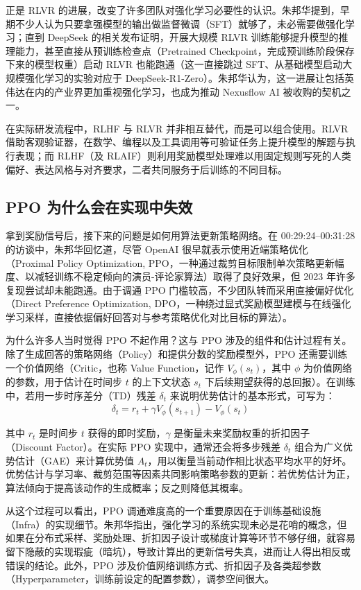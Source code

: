 \documentclass[UTF8,a4paper,11pt,fontset=fandol]{ctexart}
\begin{document}
正是 RLVR 的进展，改变了许多团队对强化学习必要性的认识。朱邦华提到，早期不少人认为只要拿强模型的输出做监督微调（SFT）就够了，未必需要做强化学习；直到 DeepSeek 的相关发布证明，开展大规模 RLVR 训练能够提升模型的推理能力，甚至直接从预训练检查点（Pretrained Checkpoint，完成预训练阶段保存下来的模型权重）启动 RLVR 也能跑通（这一直接跳过 SFT、从基础模型启动大规模强化学习的实验对应于 DeepSeek-R1-Zero）。朱邦华认为，这一进展让包括英伟达在内的产业界更加重视强化学习，也成为推动 Nexusflow AI 被收购的契机之一。

在实际研发流程中，RLHF 与 RLVR 并非相互替代，而是可以组合使用。RLVR 借助客观验证器，在数学、编程以及工具调用等可验证任务上提升模型的解题与执行表现；而 RLHF（及 RLAIF）则利用奖励模型处理难以用固定规则写死的人类偏好、表达风格与对齐要求，二者共同服务于后训练的不同目标。

\subsection{PPO 为什么会在实现中失效}
拿到奖励信号后，接下来的问题是如何用算法更新策略网络。在 00:29:24–00:31:28 的访谈中，朱邦华回忆道，尽管 OpenAI 很早就表示使用近端策略优化（Proximal Policy Optimization, PPO，一种通过裁剪目标限制单次策略更新幅度、以减轻训练不稳定倾向的演员-评论家算法）取得了良好效果，但 2023 年许多复现尝试却未能跑通。由于调通 PPO 门槛较高，不少团队转而采用直接偏好优化（Direct Preference Optimization, DPO，一种绕过显式奖励模型建模与在线强化学习采样，直接依据偏好回答对与参考策略优化对比目标的算法）。

为什么许多人当时觉得 PPO 不起作用？这与 PPO 涉及的组件和估计过程有关。除了生成回答的策略网络（Policy）和提供分数的奖励模型外，PPO 还需要训练一个价值网络（Critic，也称 Value Function，记作 \(V_\phi(s_t)\)，其中 \(\phi\) 为价值网络的参数，用于估计在时间步 \(t\) 的上下文状态 \(s_t\) 下后续期望获得的总回报）。在训练中，若用一步时序差分（TD）残差 \(\delta_t\) 来说明优势估计的基本形式，可写为：
\[
\delta_t = r_t + \gamma V_\phi(s_{t+1}) - V_\phi(s_t)
\]

其中 \(r_t\) 是时间步 \(t\) 获得的即时奖励，\(\gamma\) 是衡量未来奖励权重的折扣因子（Discount Factor）。在实际 PPO 实现中，通常还会将多步残差 \(\delta_t\) 组合为广义优势估计（GAE）来计算优势值 \(A_t\)，用以衡量当前动作相比状态平均水平的好坏。优势估计与学习率、裁剪范围等因素共同影响策略参数的更新：若优势估计为正，算法倾向于提高该动作的生成概率；反之则降低其概率。

从这个过程可以看出，PPO 调通难度高的一个重要原因在于训练基础设施（Infra）的实现细节。朱邦华指出，强化学习的系统实现未必是花哨的概念，但如果在分布式采样、奖励处理、折扣因子设计或梯度计算等环节不够仔细，就容易留下隐蔽的实现瑕疵（暗坑），导致计算出的更新信号失真，进而让人得出相反或错误的结论。此外，PPO 涉及价值网络训练方式、折扣因子及各类超参数（Hyperparameter，训练前设定的配置参数），调参空间很大。
\end{document}
